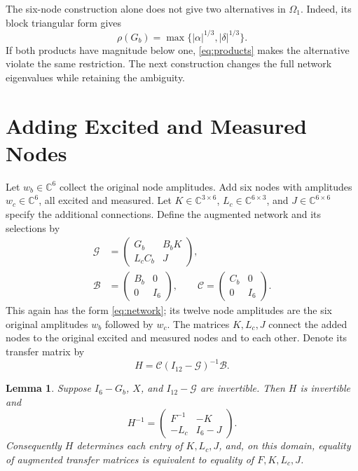 \documentclass[letterpaper,10pt,conference]{ieeeconf}
\newtheorem{lemma}{Lemma}
\newcommand{\aicite}{\texorpdfstring{\protect\cite{codex}}{}}
\begin{document}
The six-node construction alone does not give two alternatives in
\(\Omega_1\). Indeed, its block triangular form gives
\[
 \rho(G_b)=\max\{|\alpha|^{1/3},|\delta|^{1/3}\}.
\]
If both products have magnitude below one, \eqref{eq:products} makes
the alternative violate the same restriction. The next construction
changes the full network eigenvalues while retaining the ambiguity.

\section{Adding Excited and Measured Nodes \aicite}
\label{sec:augmentation}

Let \(w_b\in\mathbb C^6\) collect the original node amplitudes.
Add six nodes with amplitudes \(w_c\in\mathbb C^6\), all excited and measured.
Let \(K\in\mathbb C^{3\times6}\), \(L_c\in\mathbb C^{6\times3}\), and
\(J\in\mathbb C^{6\times6}\) specify the additional connections.
Define the augmented network and its selections by
\begin{equation}\label{eq:augmentation}
\begin{split}
 \mathcal G&=\begin{pmatrix}G_b&B_bK\\L_cC_b&J\end{pmatrix},\\
 \mathcal B&=\begin{pmatrix}B_b&0\\0&I_6\end{pmatrix},\qquad
 \mathcal C=\begin{pmatrix}C_b&0\\0&I_6\end{pmatrix}.
\end{split}
\end{equation}
This again has the form \eqref{eq:network}; its twelve node amplitudes
are the six original amplitudes \(w_b\) followed by \(w_c\).
The matrices \(K,L_c,J\) connect the added nodes to the original
excited and measured nodes and to each other.
Denote its transfer matrix by
\begin{equation}\label{eq:H}
 H=\mathcal C(I_{12}-\mathcal G)^{-1}\mathcal B.
\end{equation}

\begin{lemma}\label{lem:augmentation}
Suppose \(I_6-G_b\), \(X\), and \(I_{12}-\mathcal G\) are invertible.
Then \(H\) is invertible and
\begin{equation}\label{eq:Hinv}
 H^{-1}=\begin{pmatrix}F^{-1}&-K\\-L_c&I_6-J\end{pmatrix}.
\end{equation}
Consequently \(H\) determines each entry of \(K,L_c,J\), and, on this
domain, equality of augmented transfer matrices is equivalent to equality
of \(F,K,L_c,J\).
\end{lemma}
\end{document}
